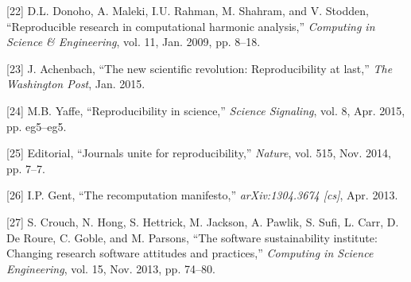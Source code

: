 \documentclass[10pt,reprint]{sigplanconf}
\begin{document}
{[}22{]} D.L. Donoho, A. Maleki, I.U. Rahman, M. Shahram, and V.
Stodden, ``Reproducible research in computational harmonic analysis,''
\emph{Computing in Science \& Engineering}, vol. 11, Jan. 2009, pp.
8--18.

{[}23{]} J. Achenbach, ``The new scientific revolution: Reproducibility
at last,'' \emph{The Washington Post}, Jan. 2015.

{[}24{]} M.B. Yaffe, ``Reproducibility in science,'' \emph{Science
Signaling}, vol. 8, Apr. 2015, pp. eg5--eg5.

{[}25{]} Editorial, ``Journals unite for reproducibility,''
\emph{Nature}, vol. 515, Nov. 2014, pp. 7--7.

{[}26{]} I.P. Gent, ``The recomputation manifesto,''
\emph{arXiv:1304.3674 {[}cs{]}}, Apr. 2013.

{[}27{]} S. Crouch, N. Hong, S. Hettrick, M. Jackson, A. Pawlik, S.
Sufi, L. Carr, D. De Roure, C. Goble, and M. Parsons, ``The software
sustainability institute: Changing research software attitudes and
practices,'' \emph{Computing in Science Engineering}, vol. 15, Nov.
2013, pp. 74--80.


\end{document}

